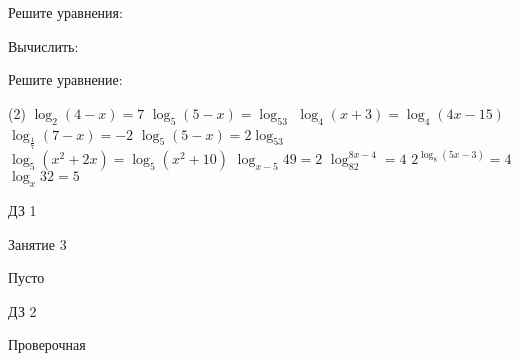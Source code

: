 \begin{class}[number=2]
	\begin{listofex}
		\item Решите уравнения:
			\begin{itasks}[2]
			\task {}
			\task {}
			\task {}
			\task {}
			\task {}
			\task {}
			\task {}
		\end{itasks}
		\item Вычислить:
		\begin{itasks}[1]
			\task {}
			\task {}
			\task {}
			\task {}
		\end{itasks}
		\item {}
		\item Решите уравнение:
		\begin{tasks}(2)
			\task \( \log_2(4-x)=7 \)
			\task \( \log_5(5-x)=\log_53 \)
			\task \( \log_4(x+3)=\log_4(4x-15) \)
			\task \( \log_{\frac{1}{7}}(7-x)=-2 \)
			\task \( \log_5(5-x)=2\log_53 \)
			\task \( \log_5(x^2+2x)=\log_5(x^2+10) \)
			\task \( \log_{x-5}49=2 \)
			\task \( \log_82^{8x-4}=4 \)
			\task \( 2^{\log_8(5x-3)}=4 \)
			\task \( \log_x32=5 \)
		\end{tasks}
	
	\end{listofex}
\end{class}

\begin{homework}[number=1]
		\begin{listofex}
			\item ДЗ 1
		\end{listofex}
\end{homework}

\begin{class}[number=3]
	\begin{listofex}
		\item Занятие 3
	\end{listofex}
\end{class}

\begin{class}[number=4]
	\begin{listofex}
		\item Пусто
	\end{listofex}
\end{class}

\begin{homework}[number=2]
	\begin{listofex}
		\item ДЗ 2
	\end{listofex}
\end{homework}

\begin{exam}
	\begin{listofex}
		\item Проверочная
	\end{listofex}
\end{exam}
